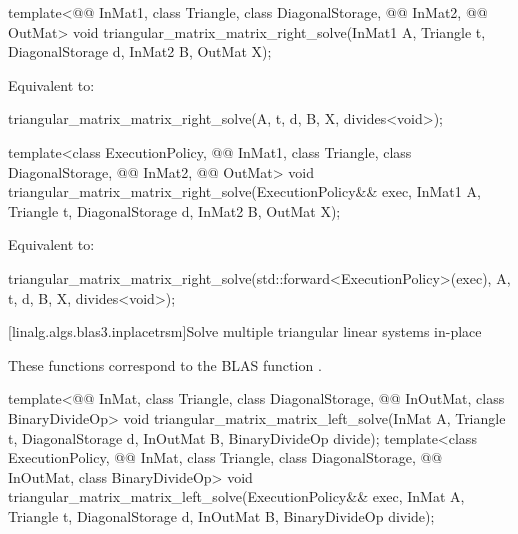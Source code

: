 %
\begin{itemdecl}
template<@@ InMat1, class Triangle, class DiagonalStorage,
         @@ InMat2, @@ OutMat>
  void triangular_matrix_matrix_right_solve(InMat1 A, Triangle t, DiagonalStorage d,
                                            InMat2 B, OutMat X);
\end{itemdecl}

\begin{itemdescr}
\pnum
\effects
Equivalent to:
\begin{codeblock}
triangular_matrix_matrix_right_solve(A, t, d, B, X, divides<void>{});
\end{codeblock}
\end{itemdescr}

%
\begin{itemdecl}
template<class ExecutionPolicy, @@ InMat1, class Triangle, class DiagonalStorage,
         @@ InMat2, @@ OutMat>
  void triangular_matrix_matrix_right_solve(ExecutionPolicy&& exec,
                                            InMat1 A, Triangle t, DiagonalStorage d,
                                            InMat2 B, OutMat X);
\end{itemdecl}

\begin{itemdescr}
\pnum
\effects
Equivalent to:
\begin{codeblock}
triangular_matrix_matrix_right_solve(std::forward<ExecutionPolicy>(exec),
                                     A, t, d, B, X, divides<void>{});
\end{codeblock}
\end{itemdescr}

[linalg.algs.blas3.inplacetrsm]{Solve multiple triangular linear systems in-place}

\pnum
\begin{note}
These functions correspond to the BLAS function \supercite{blas3}.
\end{note}

%
\begin{itemdecl}
template<@@ InMat, class Triangle, class DiagonalStorage,
         @@ InOutMat, class BinaryDivideOp>
  void triangular_matrix_matrix_left_solve(InMat A, Triangle t, DiagonalStorage d,
                                           InOutMat B, BinaryDivideOp divide);
template<class ExecutionPolicy, @@ InMat, class Triangle, class DiagonalStorage,
         @@ InOutMat, class BinaryDivideOp>
  void triangular_matrix_matrix_left_solve(ExecutionPolicy&& exec,
                                           InMat A, Triangle t, DiagonalStorage d,
                                           InOutMat B, BinaryDivideOp divide);
\end{itemdecl}

